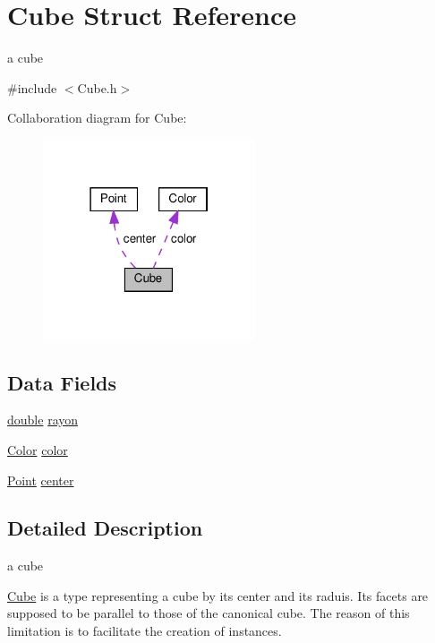 \hypertarget{struct_cube}{}\section{Cube Struct Reference}
\label{struct_cube}


a cube  




{\ttfamily \#include $<$Cube.\+h$>$}



Collaboration diagram for Cube\+:\nopagebreak
\begin{figure}[H]
\begin{center}
\leavevmode
\includegraphics[width=178pt]{struct_cube__coll__graph}
\end{center}
\end{figure}
\subsection*{Data Fields}
\begin{DoxyCompactItemize}
\item 
\hyperlink{g3x__transfo_8h_a89b2b23e407882a535d835574a7912e1}{double} \hyperlink{struct_cube_a2459aedac9f8646ad9566164a9a83f41}{rayon}
\item 
\hyperlink{struct_color}{Color} \hyperlink{struct_cube_aa5f4d1eda21c196bd8401ff73f105073}{color}
\item 
\hyperlink{struct_point}{Point} \hyperlink{struct_cube_a24bb1c337bce91dd3e7a4a4372b11793}{center}
\end{DoxyCompactItemize}


\subsection{Detailed Description}
a cube 

\hyperlink{struct_cube}{Cube} is a type representing a cube by its center and its raduis. Its facets are supposed to be parallel to those of the canonical cube. The reason of this limitation is to facilitate the creation of instances. 

